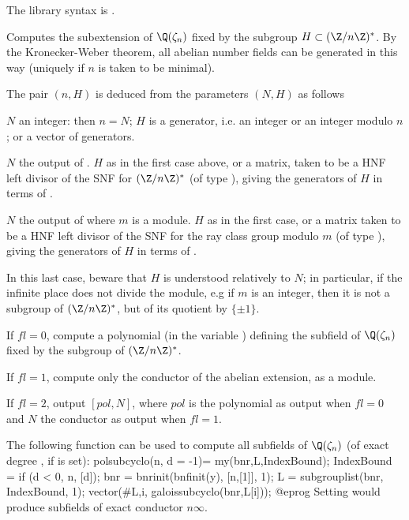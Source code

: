 The library syntax is .

\label{se:galoissubcyclo}
Computes the subextension
of $\Q(\zeta_n)$ fixed by the subgroup $H \subset (\Z/n\Z)^*$. By the
Kronecker-Weber theorem, all abelian number fields can be generated in this
way (uniquely if $n$ is taken to be minimal).

\noindent The pair $(n, H)$ is deduced from the parameters $(N, H)$ as follows

\item $N$ an integer: then $n = N$; $H$ is a generator, i.e. an
integer or an integer modulo $n$; or a vector of generators.

\item $N$ the output of . $H$ as in the first case
above, or a matrix, taken to be a HNF left divisor of the SNF for $(\Z/n\Z)^*$
(of type ), giving the generators of $H$ in terms of .

\item $N$ the output of  where $m$ is a
module. $H$ as in the first case, or a matrix taken to be a HNF left
divisor of the SNF for the ray class group modulo $m$
(of type ), giving the generators of $H$ in terms of .

In this last case, beware that $H$ is understood relatively to $N$; in
particular, if the infinite place does not divide the module, e.g if $m$ is
an integer, then it is not a subgroup of $(\Z/n\Z)^*$, but of its quotient by
$\{\pm 1\}$.

If $fl=0$, compute a polynomial (in the variable ) defining
the subfield of $\Q(\zeta_n)$ fixed by the subgroup  of $(\Z/n\Z)^*$.

If $fl=1$, compute only the conductor of the abelian extension, as a module.

If $fl=2$, output $[pol, N]$, where $pol$ is the polynomial as output when
$fl=0$ and $N$ the conductor as output when $fl=1$.

The following function can be used to compute all subfields of
$\Q(\zeta_n)$ (of exact degree , if  is set):
\bprog
polsubcyclo(n, d = -1)=
{ my(bnr,L,IndexBound);
  IndexBound = if (d < 0, n, [d]);
  bnr = bnrinit(bnfinit(y), [n,[1]], 1);
  L = subgrouplist(bnr, IndexBound, 1);
  vector(#L,i, galoissubcyclo(bnr,L[i]));
}
@eprog\noindent
Setting  would produce subfields of exact
conductor $n\infty$.

